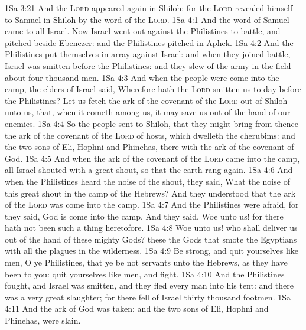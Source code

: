 \vs 1Sa 3:21 And the \textsc{Lord} appeared again in Shiloh: for the \textsc{Lord} revealed himself to Samuel in Shiloh by the word of the \textsc{Lord}.
\vs 1Sa 4:1 And the word of Samuel came to all Israel. Now Israel went out against the Philistines to battle, and pitched beside Ebenezer: and the Philistines pitched in Aphek.
\vs 1Sa 4:2 And the Philistines put themselves in array against Israel: and when they joined battle, Israel was smitten before the Philistines: and they slew of the army in the field about four thousand men.
\vs 1Sa 4:3 And when the people were come into the camp, the elders of Israel said, Wherefore hath the \textsc{Lord} smitten us to day before the Philistines? Let us fetch the ark of the covenant of the \textsc{Lord} out of Shiloh unto us, that, when it cometh among us, it may save us out of the hand of our enemies.
\vs 1Sa 4:4 So the people sent to Shiloh, that they might bring from thence the ark of the covenant of the \textsc{Lord} of hosts, which dwelleth  the cherubims: and the two sons of Eli, Hophni and Phinehas,  there with the ark of the covenant of God.
\vs 1Sa 4:5 And when the ark of the covenant of the \textsc{Lord} came into the camp, all Israel shouted with a great shout, so that the earth rang again.
\vs 1Sa 4:6 And when the Philistines heard the noise of the shout, they said, What  the noise of this great shout in the camp of the Hebrews? And they understood that the ark of the \textsc{Lord} was come into the camp.
\vs 1Sa 4:7 And the Philistines were afraid, for they said, God is come into the camp. And they said, Woe unto us! for there hath not been such a thing heretofore.
\vs 1Sa 4:8 Woe unto us! who shall deliver us out of the hand of these mighty Gods? these  the Gods that smote the Egyptians with all the plagues in the wilderness.
\vs 1Sa 4:9 Be strong, and quit yourselves like men, O ye Philistines, that ye be not servants unto the Hebrews, as they have been to you: quit yourselves like men, and fight.
\vs 1Sa 4:10 And the Philistines fought, and Israel was smitten, and they fled every man into his tent: and there was a very great slaughter; for there fell of Israel thirty thousand footmen.
\vs 1Sa 4:11 And the ark of God was taken; and the two sons of Eli, Hophni and Phinehas, were slain.
